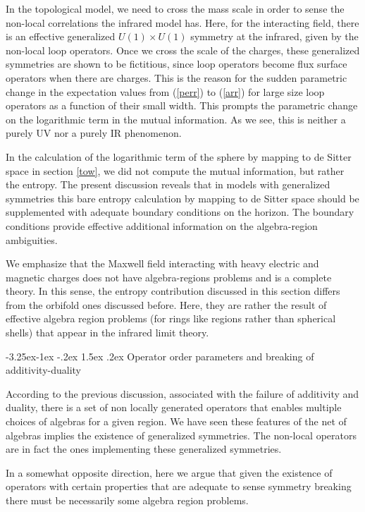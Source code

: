 \documentclass[11pt]{article}
\makeatletter
\renewcommand\subsection{\@startsection{subsection}{2}{\z@}%
                                   {-3.25ex\@plus -1ex \@minus -.2ex}%
                                     {1.5ex \@plus .2ex}%
                                     {\normalfont\bfseries}}
\numberwithin{equation}{section}
\makeatother
\begin{document}
In the topological model, we need to cross the mass scale in order to sense the non-local correlations the infrared model has. Here, for the interacting field, there is an effective generalized $U(1)\times U(1)$ symmetry at the infrared, given by the non-local loop operators. Once we cross the scale of the charges, these generalized symmetries are shown to be fictitious, since loop operators become flux surface operators when there are charges. This is the reason for the sudden parametric change in the expectation values from (\ref{perr}) to (\ref{arr}) for large size loop operators as a function of their small width. This prompts the parametric change on the logarithmic term in the mutual information. As we see, this is neither a purely UV nor a purely IR phenomenon.     

In the calculation of the logarithmic term of the sphere by mapping to de Sitter space in section \ref{tow}, we did not compute the mutual information, but rather the entropy. The present discussion reveals that in models with generalized symmetries this bare entropy calculation by mapping to de Sitter space should be supplemented with adequate boundary conditions on the horizon.  The boundary conditions provide effective additional information on the algebra-region ambiguities.

We emphasize that the Maxwell field interacting with heavy electric and magnetic charges does not have algebra-regions problems and is a complete theory. In this sense, the entropy contribution discussed in this section differs from the orbifold ones discussed before. Here, they are rather the result of effective algebra region problems (for rings like regions rather than spherical shells) that appear in the infrared limit theory. 


\subsection{Operator order parameters and breaking of additivity-duality}

According to the previous discussion, associated with the failure of additivity and duality, there is a set of non locally generated operators that enables multiple choices of algebras for a given region. We have seen these features of the net of algebras implies the existence of generalized symmetries. The non-local operators are in fact the ones implementing these generalized symmetries.

In a somewhat opposite direction, here we argue that given the existence of operators with certain properties that are adequate to sense symmetry breaking there must be necessarily some algebra region problems. 
\end{document}
